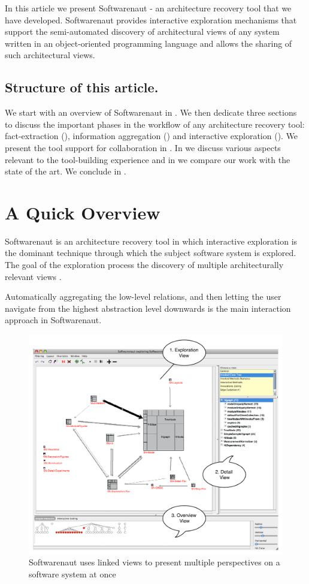 \documentclass[preprint,12pt]{elsarticle}
\begin{document}
In this article we present Softwarenaut - an architecture recovery tool that we have developed. Softwarenaut provides interactive exploration mechanisms that support the semi-automated discovery of architectural views of any system written in an object-oriented programming language and allows the sharing of such architectural views. 

\subsection*{Structure of this article.} We start with an overview of Softwarenaut in . We then dedicate three sections to discuss the important phases in the workflow of any architecture recovery tool: fact-extraction (), information aggregation () and interactive exploration (). We present the tool support for collaboration in . In  we discuss various aspects relevant to the tool-building experience and in  we compare our work with the state of the art. We conclude in .



\newpage
\section {A Quick Overview}
\label{sec:over}

Softwarenaut is an architecture recovery tool in which interactive exploration is the dominant technique through which the subject software system is explored. The goal of the exploration process the discovery of multiple architecturally relevant views \cite{lungu-packages}.

Automatically aggregating the low-level relations, and then letting the user navigate from the highest abstraction level downwards is the main interaction approach in Softwarenaut. 

\begin{figure}[h]
\begin{center}
\includegraphics[width=0.8\linewidth]{images/SnautOnSnaut}
\caption{Softwarenaut uses linked views to present multiple perspectives on a software system at once}
\end{center}
\end{figure}
\end{document}

